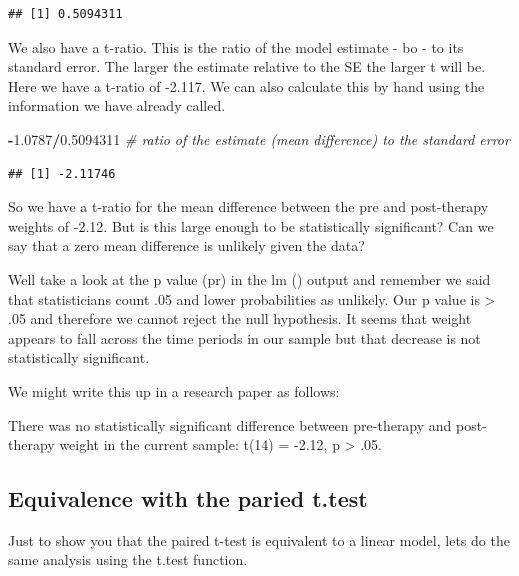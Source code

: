 \documentclass[
]{article}
\newenvironment{Shaded}{\begin{snugshade}}{\end{snugshade}}
\newcommand{\AttributeTok}[1]{\textcolor[rgb]{0.13,0.29,0.53}{#1}}
\newcommand{\CommentTok}[1]{\textcolor[rgb]{0.56,0.35,0.01}{\textit{#1}}}
\newcommand{\ConstantTok}[1]{\textcolor[rgb]{0.56,0.35,0.01}{#1}}
\newcommand{\FloatTok}[1]{\textcolor[rgb]{0.00,0.00,0.81}{#1}}
\newcommand{\FunctionTok}[1]{\textcolor[rgb]{0.13,0.29,0.53}{\textbf{#1}}}
\newcommand{\NormalTok}[1]{#1}
\newcommand{\SpecialCharTok}[1]{\textcolor[rgb]{0.81,0.36,0.00}{\textbf{#1}}}
\begin{document}
\begin{verbatim}
## [1] 0.5094311
\end{verbatim}

We also have a t-ratio. This is the ratio of the model estimate - bo -
to its standard error. The larger the estimate relative to the SE the
larger t will be. Here we have a t-ratio of -2.117. We can also
calculate this by hand using the information we have already called.

\begin{Shaded}
\begin{Highlighting}[]
\SpecialCharTok{{-}}\FloatTok{1.0787}\SpecialCharTok{/}\FloatTok{0.5094311} \CommentTok{\# ratio of the estimate (mean difference) to the standard error}
\end{Highlighting}
\end{Shaded}

\begin{verbatim}
## [1] -2.11746
\end{verbatim}

So we have a t-ratio for the mean difference between the pre and
post-therapy weights of -2.12. But is this large enough to be
statistically significant? Can we say that a zero mean difference is
unlikely given the data?

Well take a look at the p value (pr) in the lm () output and remember we
said that statisticians count .05 and lower probabilities as unlikely.
Our p value is \textgreater{} .05 and therefore we cannot reject the
null hypothesis. It seems that weight appears to fall across the time
periods in our sample but that decrease is not statistically
significant.

We might write this up in a research paper as follows:

There was no statistically significant difference between pre-therapy
and post-therapy weight in the current sample: t(14) = -2.12, p
\textgreater{} .05.

\subsection{Equivalence with the paried
t.test}\label{equivalence-with-the-paried-t.test}

Just to show you that the paired t-test is equivalent to a linear model,
lets do the same analysis using the t.test function.

\begin{Shaded}
\end{Shaded}
\end{document}
